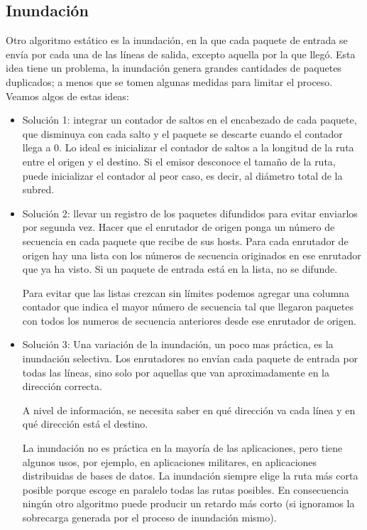 \documentclass[10pt,a4paper]{report}
\begin{document}
\subsection{Inundación}
	\par Otro algoritmo estático es la inundación, en la que cada paquete de entrada se 
	envía por cada una de las líneas de salida, excepto aquella por la que llegó.
    Esta idea tiene un problema, la inundación genera grandes cantidades de paquetes 
    duplicados; a menos que se tomen algunas medidas para limitar el proceso. Veamos 
    algos de estas ideas:

	\begin{itemize}
		\item Solución 1: integrar un contador de saltos en el encabezado de cada 
		paquete, que disminuya con cada salto y el paquete se descarte cuando el 
		contador llega a 0. Lo ideal es inicializar el contador de saltos a la longitud de la 
		ruta entre el origen y el destino. Si el emisor desconoce el tamaño de la ruta, 
		puede inicializar el contador al peor caso, es decir, al diámetro total de la subred.
		
		\item Solución 2: llevar un registro de los paquetes difundidos para evitar 
		enviarlos por segunda vez. Hacer que el enrutador de origen ponga un número de 
		secuencia en cada paquete que recibe de sus hosts. Para cada enrutador de origen 
		hay una lista con los números de secuencia originados en ese enrutador que ya ha 
		visto. Si un paquete de entrada está en la lista, no se difunde.

		Para evitar que las listas crezcan sin límites podemos agregar una columna 
		contador que indica el mayor número de secuencia tal que llegaron paquetes con 
		todos los numeros de secuencia anteriores desde ese enrutador de origen.
		
		\item Solución 3: Una variación de la inundación, un poco mas práctica, es la 
		inundación selectiva. Los enrutadores no envían cada paquete de entrada por 
		todas las líneas, sino solo por aquellas que van aproximadamente en la dirección 
		correcta.

		A nivel de información, se necesita saber en qué  dirección va cada línea y en qué 
		dirección está el destino.
		
		\par La inundación no es práctica en la mayoría de las aplicaciones, pero tiene
		algunos usos, por ejemplo, en aplicaciones militares, en aplicaciones distribuidas 
		de bases de datos. La inundación siempre elige la ruta más corta posible porque 
		escoge en paralelo todas las rutas posibles. En consecuencia ningún otro 
		algoritmo puede producir un retardo más corto (si ignoramos la sobrecarga 
		generada por el proceso de inundación mismo).
		
	\end{itemize}
		
\end{document}
